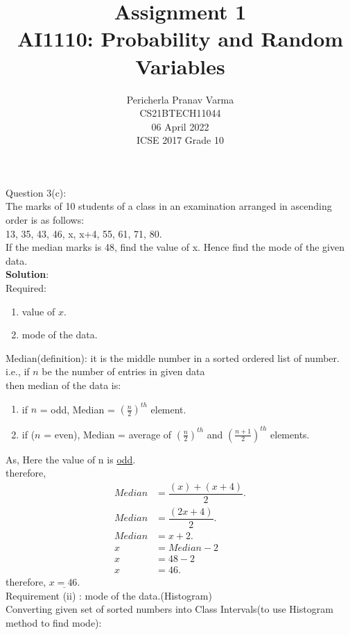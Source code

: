 \documentclass[journal,12pt,twocolumn]{IEEEtran}
\title{Assignment 1 \\ \Large AI1110: Probability and Random Variables \\ }
\author{Pericherla Pranav Varma \\ \normalsize CS21BTECH11044 \\ \vspace*{20pt} \normalsize  06 April 2022 \\ \vspace*{20pt} \Large ICSE 2017 Grade 10}
\begin{document}
\maketitle
\doublespacing
Question 3(c):\\
The marks of 10 students of a class in an examination arranged in ascending order
is as follows:\\
13, 35, 43, 46, x, x+4, 55, 61, 71, 80.\\
If the median marks is 48, find the value of x. Hence find the mode of the given
data.\\[9pt]
\textbf{Solution}:\\[8pt]
Required: 
\begin{enumerate}[label=(\roman*)]	
	\item value of $x$.
	\item mode of the data.
\end{enumerate}

Median(definition): it is the middle number in a sorted ordered list of number. \\
i.e., if $n$ be the number of entries in given data\\
then median of the data is:\\
\begin{enumerate}[label=(\roman*)]
\item if $n$ = odd, Median = $(\frac{n}{2})^{th}$ element.\\
\item if ($n$ = even), Median = average of $(\frac{n}{2})^{th}$ and $(\frac{n+1}{2})^{th}$ elements.\\[6pt]
\end{enumerate}
As, Here the value of n is \underline{odd}.\\
	therefore,\\
	\begin{align}
	Median &= \dfrac{(x)+(x+4)}{2}.\\
	  Median &= \dfrac{(2x+4)}{2}.\\
	 Median &= x+2.\\
	 x &= Median-2\\
	 x&=48-2\\
	 x&=46.
	\end{align}	
	therefore, $ \underline{x=46.}$ \\[10pt]
Requirement (ii) : mode of the data.(Histogram) \\[4pt]
Converting given set of sorted numbers into Class Intervals(to use Histogram method to find mode):\\[12pt]
\end{document}
